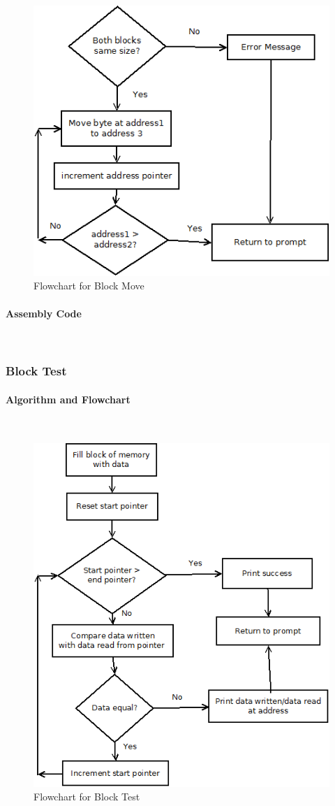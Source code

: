 \documentclass[12pt]{article}
\begin{document}
\begin{figure}[H]
\centering
\includegraphics[width=0.7\linewidth]{BMOV}
\caption{Flowchart for Block Move}
\label{fig:BMOV}
\end{figure}
			\paragraph{Assembly Code}~\\				%
			
			\subsubsection{Block Test}
			\paragraph{Algorithm and Flowchart}~\\
			
			
\begin{figure}[H]
\centering
\includegraphics[width=0.7\linewidth]{BTST}
\caption{Flowchart for Block Test}
\label{fig:BTST}
\end{figure}
			
\end{document}
